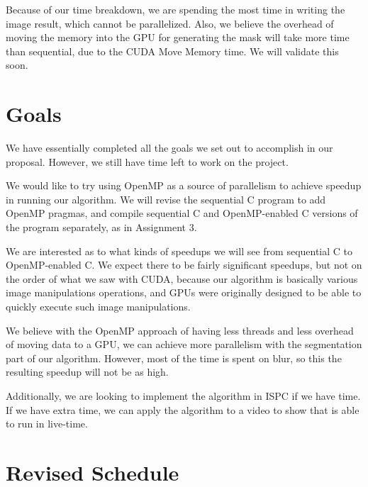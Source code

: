 \documentclass[12pt]{article}
\begin{document}
Because of our time breakdown, we are spending the most time in writing the
image result, which cannot be parallelized. Also, we believe the overhead of
moving the memory into the GPU for generating the mask will take more time than
sequential, due to the CUDA Move Memory time. We will validate this soon.

\section{Goals}

We have essentially completed all the goals we set out to accomplish in our
proposal. However, we still have time left to work on the project.

We would like to try using OpenMP as a source of parallelism to achieve speedup
in running our algorithm. We will revise the sequential C program to add OpenMP
pragmas, and compile sequential C and OpenMP-enabled C versions of the program
separately, as in Assignment 3.

We are interested as to what kinds of speedups we will see from sequential C to
OpenMP-enabled C. We expect there to be fairly significant speedups, but not on
the order of what we saw with CUDA, because our algorithm is basically various
image manipulations operations, and GPUs were originally designed to be able to
quickly execute such image manipulations.

We believe with the OpenMP approach of having less threads and less overhead of
moving data to a GPU, we can achieve more parallelism with the segmentation
part of our algorithm. However, most of the time is spent on blur, so this the
resulting speedup will not be as high.

Additionally, we are looking to implement the algorithm in ISPC if we have time.
If we have extra time, we can apply the algorithm to a video to show that is
able to run in live-time.

\section{Revised Schedule}
\end{document}
